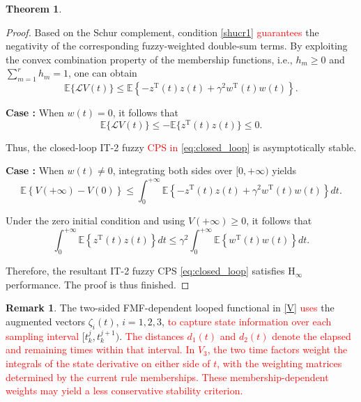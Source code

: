 \documentclass[preprint,review,fleqn,sort&compress,3p]{elsarticle}
\theoremstyle{definition} %
\theoremstyle{definition}%
\newtheorem{thm}{Theorem}[section]
\newtheorem{rem}{Remark}[section]
\begin{document}
\begin{thm}
\begin{proof}
			Based on the Schur complement, condition \eqref{shucr1} \textcolor{red}{guarantees} the negativity of the corresponding fuzzy-weighted double-sum terms. By exploiting the convex combination property of the membership functions, i.e., $h_m \ge 0$ and $\sum_{m=1}^{r} h_m = 1$, one can obtain
			\begin{equation}
				\mathbb{E}\{\mathcal{L}V(t)\}
				\leq
				\mathbb{E} \left\{
				-z^{\mathrm{T}}(t)z(t)
				+\gamma^2 w^{\mathrm{T}}(t)w(t)
				\right\}.
			\end{equation}
			
			\textbf{Case \uppercase\expandafter{}:} When $w(t)=0$, it follows that
			\begin{equation}
				\mathbb{E}\{\mathcal{L}V(t)\}
				\leq
				-\mathbb{E}\{z^{\mathrm{T}}(t)z(t)\}
				\leq 0.
			\end{equation}
			
			Thus, the closed-loop IT-2 fuzzy \textcolor{red}{CPS in} \eqref{eq:closed_loop} is asymptotically stable.
			
			\textbf{Case \uppercase\expandafter{}:} When $w(t)\neq0$, integrating both sides over $[0,+\infty)$ yields
			\begin{equation}
				\mathbb{E}\left\{V(+\infty)-V(0)\right\}
				\leq
				\int_{0}^{+\infty}
				\mathbb{E}\left\{
				-z^{\mathrm{T}}(t)z(t)
				+\gamma^2 w^{\mathrm{T}}(t)w(t)
				\right\}dt.
			\end{equation}
			
			Under the zero initial condition and using $V(+\infty)\ge0$, it follows that
			\begin{equation}
				\int_{0}^{+\infty}
				\mathbb{E}\left\{
				z^{\mathrm{T}}(t)z(t)
				\right\}dt
				\leq
				\gamma^2
				\int_{0}^{+\infty}
				\mathbb{E}\left\{
				w^{\mathrm{T}}(t)w(t)
				\right\}dt.
			\end{equation}
			
			Therefore, the resultant IT-2 fuzzy CPS \eqref{eq:closed_loop} satisfies $\mathrm{H}_\infty$ performance. The proof is thus finished.
		\end{proof}
	\end{thm}
	\begin{rem}
		The two-sided FMF-dependent looped functional in \eqref{V} \textcolor{red}{uses} the augmented vectors $\zeta_i(t)$, $i=1,2,3$, \textcolor{red}{to capture state information over each sampling interval} $[t_k^j,t_k^{j+1})$.
		\textcolor{red}{The distances $d_1(t)$ and $d_2(t)$ denote the elapsed and remaining times within that interval.}
		\textcolor{red}{In $V_3$, the two time factors weight the integrals of the state derivative on either side of $t$, with the weighting matrices determined by the current rule memberships.}
		\textcolor{red}{These membership-dependent weights may yield a less conservative stability criterion.}
	\end{rem}
\end{document}
